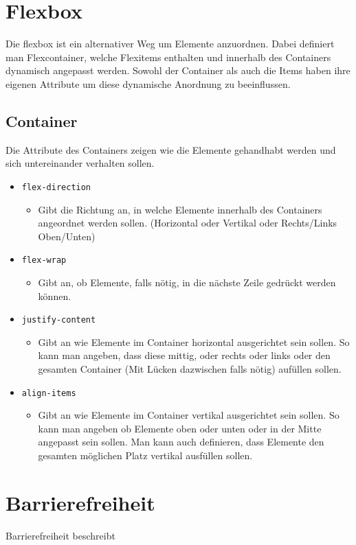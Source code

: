 \documentclass{article}
\begin{document}
\begin{itemize}
	\section{Flexbox}
	Die flexbox ist ein alternativer Weg um Elemente anzuordnen. Dabei definiert man Flexcontainer, welche Flexitems enthalten und innerhalb des Containers dynamisch angepasst werden. Sowohl der Container als auch die Items haben ihre eigenen Attribute um diese dynamische Anordnung zu beeinflussen.
	\subsection{Container}
	Die Attribute des Containers zeigen wie die Elemente gehandhabt werden und sich untereinander verhalten sollen.
	\begin{itemize}
		\item{\texttt{flex-direction}}
		\begin{itemize}
			\item{Gibt die Richtung an, in welche Elemente innerhalb des Containers angeordnet werden sollen. (Horizontal oder Vertikal oder Rechts/Links Oben/Unten)}
		\end{itemize}
		\item{\texttt{flex-wrap}}
		\begin{itemize}
			\item{Gibt an, ob Elemente, falls nötig, in die nächste Zeile gedrückt werden können.}
		\end{itemize}
		\item{\texttt{justify-content}}
		\begin{itemize}
			\item{Gibt an wie Elemente im Container horizontal ausgerichtet sein sollen. So kann man angeben, dass diese mittig, oder rechts oder links oder den gesamten Container (Mit Lücken dazwischen falls nötig) aufüllen sollen.}
		\end{itemize}
		\item{\texttt{align-items}}
		\begin{itemize}
			\item{Gibt an wie Elemente im Container vertikal ausgerichtet sein sollen. So kann man angeben ob Elemente oben oder unten oder in der Mitte angepasst sein sollen. Man kann auch definieren, dass Elemente den gesamten möglichen Platz vertikal ausfüllen sollen.}
		\end{itemize}
	\end{itemize}
	\section{Barrierefreiheit}
	Barrierefreiheit beschreibt

\end{itemize}
\end{document}
